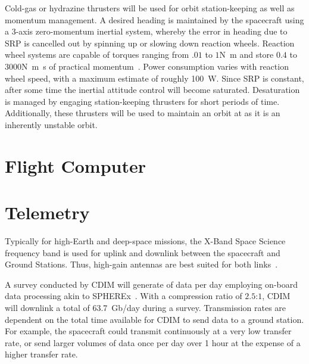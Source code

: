 \documentclass{ws-jai}
\begin{document}
Cold-gas or hydrazine thrusters will be used for orbit station-keeping as well as momentum management.
A desired heading is maintained by the spacecraft using a 3-axis zero-momentum inertial system, whereby the error in heading due to SRP is cancelled out by spinning up or slowing down reaction wheels.
Reaction wheel systems are capable of torques ranging from $.01$ to $1$\si{\newton\meter} and store $0.4$ to $3000$\si{\newton\meter\second} of practical momentum~\cite{smad2015}.
Power consumption varies with reaction wheel speed, with a maximum estimate of roughly \SI{100}{\watt}.
Since SRP is constant, after some time the inertial attitude control will become saturated.
Desaturation is managed by engaging station-keeping thrusters for short periods of time.
Additionally, these thrusters will be used to maintain an orbit at \Ltwo{} as it is an inherently unstable orbit.

\section{Flight Computer}

\section{Telemetry}
\label{sec:telemetry}
Typically for high-Earth and deep-space missions, the X-Band Space Science frequency band is used for uplink and downlink between the spacecraft and Ground Stations.
Thus, high-gain antennas are best suited for both links~\cite{smad2015}.

A survey conducted by CDIM will generate  of data per day employing on-board data processing akin to SPHEREx~\cite{spherexTelemetry2016}.
With a compression ratio of $2.5$:$1$, CDIM will downlink a total of \SI{63.7}{Gb/day} during a survey.
Transmission rates are dependent on the total time available for CDIM to send data to a ground station.
For example, the spacecraft could transmit continuously at a very low transfer rate, or send larger volumes of data once per day over 1 hour at the expense of a higher transfer rate.
\end{document}
